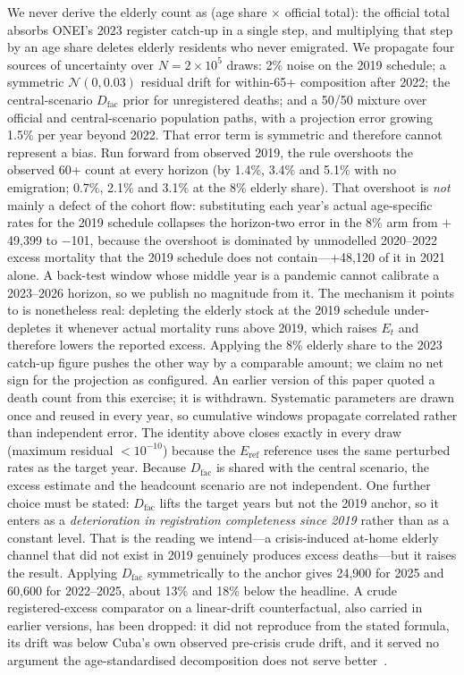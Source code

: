 \documentclass[11pt,a4paper]{article}
\begin{document}
We never derive the elderly count as (age share $\times$ official total): the official total absorbs ONEI's 2023 register catch-up in a single step, and multiplying that step by an age share deletes elderly residents who never emigrated.
We propagate four sources of uncertainty over $N=2\times10^5$ draws: 2\% noise on the 2019 schedule; a symmetric $\mathcal{N}(0,0.03)$ residual drift for within-65+ composition after 2022; the central-scenario $D_{\mathrm{fac}}$ prior for unregistered deaths; and a 50/50 mixture over official and central-scenario population paths, with a projection error growing 1.5\% per year beyond 2022. That error term is symmetric and therefore cannot represent a bias. Run forward from observed 2019, the rule overshoots the observed 60+ count at every horizon (by 1.4\%, 3.4\% and 5.1\% with no emigration; 0.7\%, 2.1\% and 3.1\% at the 8\% elderly share). That overshoot is \emph{not} mainly a defect of the cohort flow: substituting each year's actual age-specific rates for the 2019 schedule collapses the horizon-two error in the 8\% arm from $+$49{,}399 to $-$101, because the overshoot is dominated by unmodelled 2020--2022 excess mortality that the 2019 schedule does not contain---$+$48{,}120 of it in 2021 alone. A back-test window whose middle year is a pandemic cannot calibrate a 2023--2026 horizon, so we publish no magnitude from it. The mechanism it points to is nonetheless real: depleting the elderly stock at the 2019 schedule under-depletes it whenever actual mortality runs above 2019, which raises $E_t$ and therefore lowers the reported excess. Applying the 8\% elderly share to the 2023 catch-up figure pushes the other way by a comparable amount; we claim no net sign for the projection as configured. An earlier version of this paper quoted a death count from this exercise; it is withdrawn.
Systematic parameters are drawn once and reused in every year, so cumulative windows propagate correlated rather than independent error.
The identity above closes exactly in every draw (maximum residual $<10^{-10}$) because the $E_{\mathrm{ref}}$ reference uses the same perturbed rates as the target year.
Because $D_{\mathrm{fac}}$ is shared with the central scenario, the excess estimate and the headcount scenario are not independent.
One further choice must be stated: $D_{\mathrm{fac}}$ lifts the target years but not the 2019 anchor, so it enters as a \emph{deterioration in registration completeness since 2019} rather than as a constant level. That is the reading we intend---a crisis-induced at-home elderly channel that did not exist in 2019 genuinely produces excess deaths---but it raises the result. Applying $D_{\mathrm{fac}}$ symmetrically to the anchor gives 24{,}900 for 2025 and 60{,}600 for 2022--2025, about 13\% and 18\% below the headline.
A crude registered-excess comparator on a linear-drift counterfactual, also carried in earlier versions, has been dropped: it did not reproduce from the stated formula, its drift was below Cuba's own observed pre-crisis crude drift, and it served no argument the age-standardised decomposition does not serve better~\citep{karlinsky2021,msemburi2023,kishore2018}.
\end{document}
